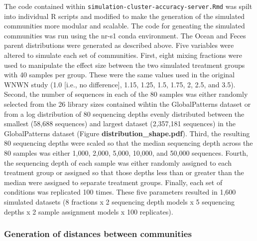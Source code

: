 \documentclass[
]{article}
\begin{document}
The code contained within
\texttt{simulation-cluster-accuracy-server.Rmd} was spilt into
individual R scripts and modified to make the generation of the
simulated communities more modular and scalable. The code for geneating
the simulated communities was run using the nr-s1 conda environment. The
Ocean and Feces parent distributions were generated as described above.
Five variables were altered to simulate each set of communities. First,
eight mixing fractions were used to manipulate the effect size between
the two simulated treatment groups with 40 samples per group. These were
the same values used in the original WNWN study (1.0 {[}i.e., no
difference{]}, 1.15, 1.25, 1.5, 1.75, 2, 2.5, and 3.5). Second, the
number of sequences in each of the 80 samples was either randomly
selected from the 26 library sizes contained wihtin the GlobalPatterns
dataset or from a log distribution of 80 sequencing depths evenly
distributed between the smallest (58,688 sequences) and largest dataset
(2,357,181 sequences) in the GlobalPatterns dataset (Figure
\textbf{distribution\_shape.pdf}). Third, the resulting 80 sequencing
depths were scaled so that the median sequencing depth across the 80
samples was either 1,000, 2,000, 5,000, 10,000, and 50,000 sequences.
Fourth, the sequencing depth of each sample was either randomly assigned
to each treatment group or assigned so that those depths less than or
greater than the median were assigned to separate treatment groups.
Finally, each set of conditions was replicated 100 times. These five
parameters resulted in 1,600 simulated datasets (8 fractions x 2
sequencing depth models x 5 sequencing depths x 2 sample assignment
models x 100 replicates).

\hypertarget{generation-of-distances-between-communities}{%
\subsubsection{Generation of distances between
communities}\label{generation-of-distances-between-communities}}
\end{document}
